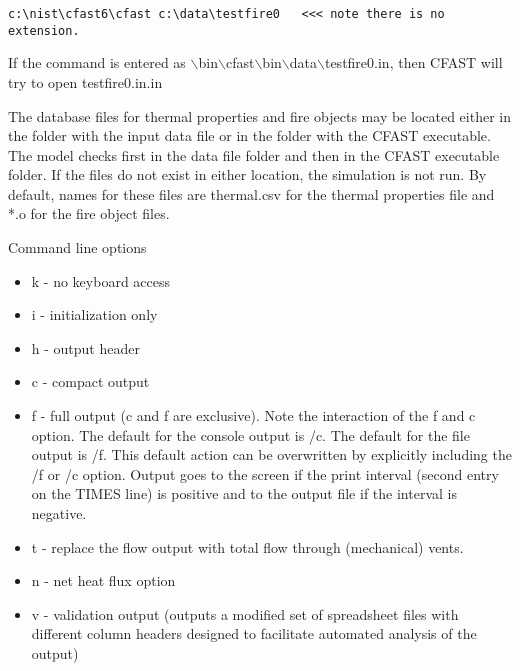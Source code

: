 \begin{lstlisting}
c:\nist\cfast6\cfast c:\data\testfire0   <<< note there is no extension.
\end{lstlisting}

If the command is entered as $\backslash$bin$\backslash$cfast$\backslash$bin$\backslash$data$\backslash$testfire0.in, then CFAST will try to open testfire0.in.in

The database files for thermal properties and fire objects may be located either in the folder with the input data file or in the folder with the CFAST executable. The model checks first in the data file folder and then in the CFAST executable folder.  If the files do not exist in either location, the simulation is not run. By default, names for these files are thermal.csv for the thermal properties file and *.o for the fire object files.

Command line options

\begin{itemize}
\item k - no keyboard access
\item i - initialization only
\item h - output header
\item c - compact output
\item f - full output (c and f are exclusive). Note the interaction of the f and c option. The default for the console output is /c. The default for the file output is /f. This default action can be overwritten by explicitly including the /f or /c option. Output goes to the screen if the print interval (second entry on the TIMES line) is positive and to the output file if the interval is negative.
\item t - replace the flow output with total flow through (mechanical) vents.
\item n - net heat flux option
\item v - validation output (outputs a modified set of spreadsheet files with different column headers designed to facilitate automated analysis of the output)
\end{itemize}

